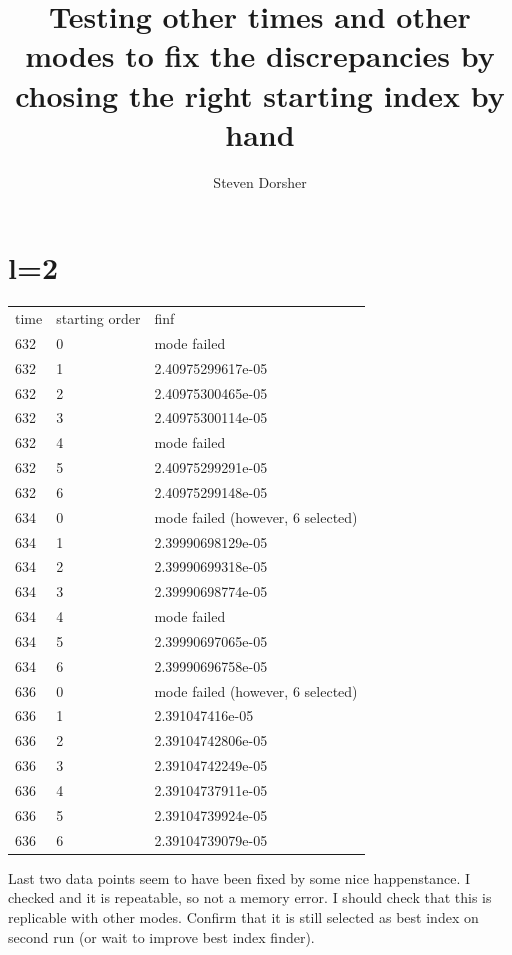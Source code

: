 \documentclass{article}
\begin{document}
\title{Testing other times and other modes to fix the discrepancies by chosing the right starting index by hand}
\author{Steven Dorsher}
\maketitle

\section{l=2}
\begin{table}
  \begin{tabular}{lll}
    time & starting order & finf\\
    632 & 0 & mode failed\\
    632 & 1 & 2.40975299617e-05\\
    632 & 2 & 2.40975300465e-05\\
    632 & 3 & 2.40975300114e-05\\
    632 & 4 & mode failed\\
    632 & 5 & 2.40975299291e-05\\
    632 & 6 & 2.40975299148e-05\\
    \hline
    634 & 0 & mode failed (however, 6 selected)\\
    634 & 1 & 2.39990698129e-05\\
    634 & 2 & 2.39990699318e-05\\
    634 & 3 & 2.39990698774e-05\\
    634 & 4 & mode failed\\
    634 & 5 & 2.39990697065e-05\\
    634 & 6 & 2.39990696758e-05\\
    \hline
    636 & 0 & mode failed (however, 6 selected)\\
    636 & 1 & 2.391047416e-05\\
    636 & 2 & 2.39104742806e-05\\
    636 & 3 & 2.39104742249e-05\\
    636 & 4 & 2.39104737911e-05\\
    636 & 5 & 2.39104739924e-05\\
    636 & 6 & 2.39104739079e-05\\
  \end{tabular}
\end{table}

Last two data points seem to have been fixed by some nice happenstance. I checked and it is repeatable, so not a memory error. I should check that this is replicable with other modes. Confirm that it is still selected as best index on second run (or wait to improve best index finder). 
\end{document}
